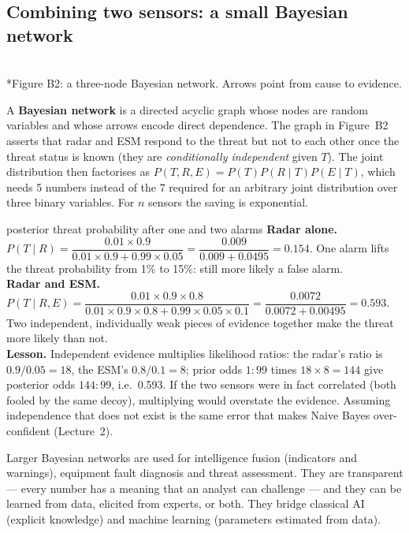 \documentclass[11pt]{article}
\begin{document}
\subsection{Combining two sensors: a small Bayesian network}
\begin{center}\\*{\small\color{GreyN}Figure B2: a three-node Bayesian network. Arrows point from cause to evidence.}\end{center}
A \textbf{Bayesian network} is a directed acyclic graph whose nodes are random variables and whose arrows encode direct dependence. The graph in Figure~B2 asserts that radar and ESM respond to the threat but not to each other once the threat status is known (they are \emph{conditionally independent} given $T$). The joint distribution then factorises as $P(T,R,E)=P(T)P(R\mid T)P(E\mid T)$, which needs 5 numbers instead of the 7 required for an arbitrary joint distribution over three binary variables. For $n$ sensors the saving is exponential.
\begin{example}{posterior threat probability after one and two alarms}
\textbf{Radar alone.} $P(T\mid R)=\dfrac{0.01\times0.9}{0.01\times0.9+0.99\times0.05}=\dfrac{0.009}{0.009+0.0495}=0.154.$ One alarm lifts the threat probability from 1\% to 15\%: still more likely a false alarm.\\[3pt]
\textbf{Radar and ESM.} $P(T\mid R,E)=\dfrac{0.01\times0.9\times0.8}{0.01\times0.9\times0.8+0.99\times0.05\times0.1}=\dfrac{0.0072}{0.0072+0.00495}=0.593.$ Two independent, individually weak pieces of evidence together make the threat more likely than not.\\[3pt]
\textbf{Lesson.} Independent evidence multiplies likelihood ratios: the radar's ratio is $0.9/0.05=18$, the ESM's $0.8/0.1=8$; prior odds $1:99$ times $18\times8=144$ give posterior odds $144:99$, i.e.\ 0.593. If the two sensors were in fact correlated (both fooled by the same decoy), multiplying would overstate the evidence. Assuming independence that does not exist is the same error that makes Naive Bayes over-confident (Lecture~2).
\end{example}
Larger Bayesian networks are used for intelligence fusion (indicators and warnings), equipment fault diagnosis and threat assessment. They are transparent --- every number has a meaning that an analyst can challenge --- and they can be learned from data, elicited from experts, or both. They bridge classical AI (explicit knowledge) and machine learning (parameters estimated from data).
\end{document}
